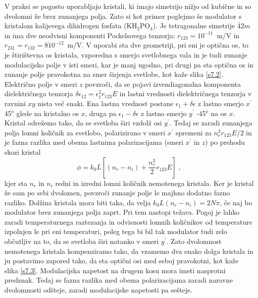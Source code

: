 V praksi se pogosto uporabljajo kristali, ki imajo simetrijo nižjo
od kubične in so dvolomni že brez zunanjega polja. Zato si kot primer
poglejmo še modulator s kristalom kalijevega dihidrogen fosfata (KH$_{2}$PO$_{4}$).
Je tetragonalne simetrije $\bar{4}2m$ in ima dve neodvisni komponenti
Pockelsovega tenzorja: $r_{123}=10^{-11}$~m/V in $r_{231}=r_{132}=8\dot{1}0^{-12}$~m/V.
V uporabi sta dve geometriji, pri eni je optična os, to je štirištevna
os kristala, vzporedna s smerjo svetlobnega vala in je tudi zunanje
modulacijsko polje v isti smeri, kar je manj ugodno, pri drugi pa
sta optična os in zunanje polje pravokotna na smer širjenja svetlobe,
kot kaže slika \ref{s7.2}. Električno polje v smeri $z$ povzroči,
da se pojavi izvendiagonalna komponenta dielektričnega tenzorja $\delta\epsilon_{12}=\epsilon_{1}^{2}r_{123}E$
in lastni vrednosti dielektričnega tenzorja v ravnini $xy$ nista
več enaki. Ena lastna vrednost postane $\epsilon_{1}+\delta\epsilon$
z lastno smerjo $x^{\prime}$ 45$^{o}$ glede na kristalno os $x$,
druga pa $\epsilon_{1}-\delta\epsilon$ z lastno smerjo $y^{\prime}$
-45$^{o}$ na os $x$. Kristal odrežemo tako, da se svetloba širi
vzdolž osi $y^{\prime}$. Tedaj se zaradi zunanjega polja lomni količnik
za svetlobo, polarizirano v smeri $x^{\prime}$ spremeni za $n_{r}^{3}r_{123}E/2$
in je fazna razlika med obema lastnima polarizacijama (smeri $x^{\prime}$
in $z$) po prehodu skozi kristal 
\begin{equation}
\phi=k_{0}L\left[(n_{r}-n_{i})+\frac{n_{r}^{3}}{2}r_{123}E\right]\;,\label{7.19}
\end{equation}
 kjer sta $n_{r}$ in $n_{i}$ redni in izredni lomni količnik nemotenega
kristala. Ker je kristal že sam po sebi dvolomen, povzroči zunanje
polje le majhno dodatno fazno razliko. Dolžina kristala mora biti
taka, da velja $k_{0}L(n_{r}-n_{i})=2N\pi$, če naj bo modulator brez
zunanjega polja zaprt. Pri tem nastopi težava. Pogoj je lahko zaradi
temperaturnega raztezanja in odvisnosti lomnih količnikov od temperature
izpolnjen le pri eni temperaturi, poleg tega bi bil tak modulator
tudi zelo občutljiv na to, da se svetloba širi natanko v smeri $y^{\prime}$.
Zato dvolomnost nemotenega kristala kompenziramo tako, da vzamemo
dva enako dolga kristala in ju postavimo zapored tako, da sta optični
osi med seboj pravokotni, kot kaže slika \ref{s7.3}. Modulacijska
napetost na drugem kosu mora imeti nasprotni predznak. Tedaj se fazna
razlika med obema polarizacijama zaradi naravne dvolomnosti odšteje,
zaradi modulacijske napetosti pa sešteje.


